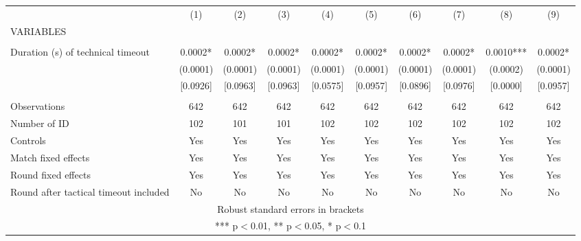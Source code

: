 \documentclass[]{article}
\begin{document}
\begin{tabular}{lccccccccc} \hline
 & (1) & (2) & (3) & (4) & (5) & (6) & (7) & (8) & (9) \\
VARIABLES &  &  &  &  &  &  &  &  &  \\ \hline
 &  &  &  &  &  &  &  &  &  \\
Duration (s) of technical timeout & 0.0002* & 0.0002* & 0.0002* & 0.0002* & 0.0002* & 0.0002* & 0.0002* & 0.0010*** & 0.0002* \\
 & (0.0001) & (0.0001) & (0.0001) & (0.0001) & (0.0001) & (0.0001) & (0.0001) & (0.0002) & (0.0001) \\
 & [0.0926] & [0.0963] & [0.0963] & [0.0575] & [0.0957] & [0.0896] & [0.0976] & [0.0000] & [0.0957] \\
 &  &  &  &  &  &  &  &  &  \\
Observations & 642 & 642 & 642 & 642 & 642 & 642 & 642 & 642 & 642 \\
Number of ID & 102 & 101 & 101 & 102 & 102 & 102 & 102 & 102 & 102 \\
Controls & Yes & Yes & Yes & Yes & Yes & Yes & Yes & Yes & Yes \\
Match fixed effects & Yes & Yes & Yes & Yes & Yes & Yes & Yes & Yes & Yes \\
Round fixed effects & Yes & Yes & Yes & Yes & Yes & Yes & Yes & Yes & Yes \\
 Round after tactical timeout included & No & No & No & No & No & No & No & No & No \\ \hline
\multicolumn{10}{c}{ Robust standard errors in brackets} \\
\multicolumn{10}{c}{ *** p$<$0.01, ** p$<$0.05, * p$<$0.1} \\
\end{tabular}
\end{document}

